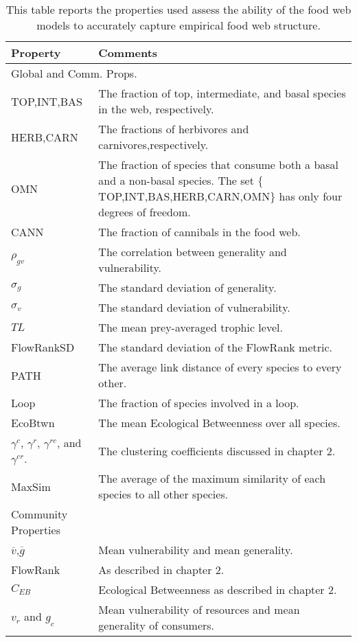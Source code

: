 \documentclass[/home/nkappler/Research/Dissertation/
 dissertation.tex]{subfiles}
\begin{document}
\begin{bibunit}
\begin{table}
    \begin{tabular}{l p{4in}}
        \toprule
        Property & Comments\\
        \midrule
        \multicolumn{2}{l}{Global and Comm. Props.}\\\cmidrule{1-1}
        TOP,INT,BAS&The fraction of top, intermediate, and basal species in the
        web, respectively.\\
        HERB,CARN&The fractions of herbivores and carnivores,respectively.\\
        OMN&The fraction of species that consume both a basal and a non-basal
        species. The set $\{$TOP,INT,BAS,HERB,CARN,OMN$\}$ has only
        four degrees of freedom.\\
        CANN&The fraction of cannibals in the food web.\\
        $\rho_{gv}$&The correlation between generality and vulnerability.\\
        $\sigma_{g}$&The standard deviation of generality.\\
        $\sigma_{v}$&The standard deviation of vulnerability.\\
        $TL$&The mean prey-averaged trophic level.\\
        FlowRankSD&The standard deviation of the FlowRank metric.\\
        PATH&The average link distance of every species to every other.\\
        Loop&The fraction of species involved in a loop.\\
        EcoBtwn&The mean Ecological Betweenness over all species.\\
        $\gamma^{c}$, $\gamma^{r}$, $\gamma^{rc}$, and $\gamma^{cr}$.& The
        clustering coefficients discussed in chapter 2.\\
        MaxSim&The average of the maximum similarity of each species to all
        other species.\\
        \midrule
        Community Properties\\\cmidrule{1-1}
        $\overline{v}$,$\overline{g}$&Mean vulnerability and mean generality.\\
        FlowRank&As described in chapter 2.\\
        $C_{EB}$&Ecological Betweenness as described in chapter
        2.\\
        $v_r$ and $g_c$&Mean vulnerability of resources and mean generality of
        consumers.\\\bottomrule  
    \end{tabular}
    \caption[Laundry list of network properties]{This table reports the properties used assess the
    ability of the food web models to accurately capture empirical food web
    structure.
    \label{tab:assProps}}
\end{table}


\end{bibunit}
\end{document}

